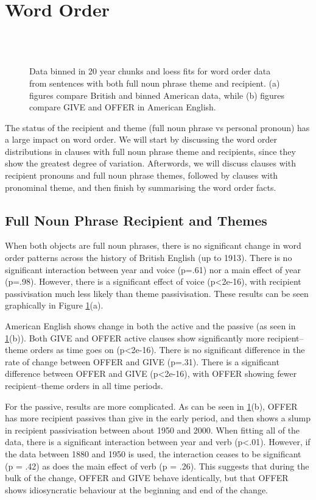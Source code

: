 \section{Word Order}

\begin{figure}[p]
\\
\\
\label{Fig:wordordnouns}
\caption{Data binned in 20 year chunks and loess fits for word order data from sentences with both full noun phrase theme and recipient. (a) figures compare British and binned American data, while (b) figures compare GIVE and OFFER in American English.}
\end{figure}

The status of the recipient and theme (full noun phrase vs personal pronoun) has a large impact on word order. We will start by discussing the word order distributions in clauses with full noun phrase theme and recipients, since they show the greatest degree of variation. Afterwords, we will discuss clauses with recipient pronouns and full noun phrase themes, followed by clauses with pronominal theme, and then finish by summarising the word order facts.

\subsection{Full Noun Phrase Recipient and Themes}
When both objects are full noun phrases, there is no significant change in word order patterns across the history of British English (up to 1913). There is no significant interaction between year and voice (p=.61) nor a main effect of year (p=.98). However, there is a significant effect of voice (p\textless 2e-16), with recipient passivisation much less likely than theme passivisation. These results can be seen graphically in Figure \ref{Fig:wordordnouns}(a).

American English shows change in both the active and the passive (as seen in \ref{Fig:wordordnouns}(b)). Both GIVE and OFFER active clauses show significantly more recipient--theme orders as time goes on (p\textless 2e-16). There is no significant difference in the rate of change between OFFER and GIVE (p=.31). There is a significant difference between OFFER and GIVE (p\textless 2e-16), with OFFER showing fewer recipient--theme orders in all time periods.

For the passive, results are more complicated. As can be seen in \ref{Fig:wordordnouns}(b), OFFER has more recipient passives than give in the early period, and then shows a slump in recipient passivisation between about 1950 and 2000. When fitting all of the data, there is a significant interaction between year and verb (p\textless .01). However, if the data between 1880 and 1950 is used, the interaction ceases to be significant (p = .42) as does the main effect of verb (p = .26). This suggests that during the bulk of the change, OFFER and GIVE behave identically, but that OFFER shows idiosyncratic behaviour at the beginning and end of the change.

